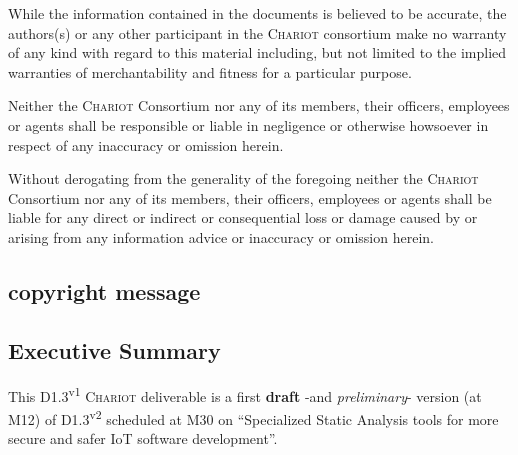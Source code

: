 \documentclass[11pt,a4paper,svgnames]{article}
\begin{document}
\begin{titlepage}
\begin{center}
{{      While the information contained in
      the documents is believed to be accurate, the authors(s) or any
      other participant in the \textsc{Chariot} consortium make no
      warranty of any kind with regard to this material including, but
      not limited to the implied warranties of merchantability and
      fitness for a particular purpose.

      Neither the \textsc{Chariot}
      Consortium nor any of its members, their officers, employees or
      agents shall be responsible or liable in negligence or otherwise
      howsoever in respect of any inaccuracy or omission herein.
      
      Without derogating from the generality of the foregoing neither
      the \textsc{Chariot} Consortium nor any of its members, their
      officers, employees or agents shall be liable for any direct or
      indirect or consequential loss or damage caused by or arising
      from any information advice or inaccuracy or omission herein.  }
  }
\end{center}

\smallskip



 \subsection*{copyright message}

 \begin{center}
 \end{center}


  \subsection*{Executive Summary}

  This D1.3\textsuperscript{v1} \textsc{Chariot} deliverable is
  {\color{red}{(was)}} a first \textbf{draft} -and \emph{preliminary}-
  version (at M12) of D1.3\textsuperscript{v2} scheduled at M30 on
  ``Specialized Static Analysis tools for more secure and safer IoT
  software development''.


\end{titlepage}
\end{document}
